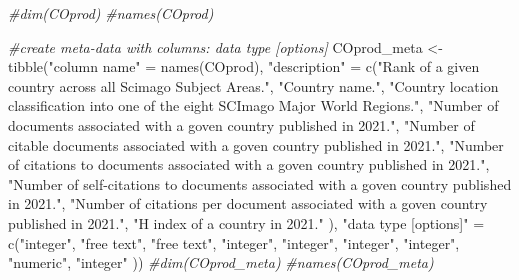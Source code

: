 \documentclass[
]{article}
\newenvironment{Shaded}{\begin{snugshade}}{\end{snugshade}}
\newcommand{\CommentTok}[1]{\textcolor[rgb]{0.56,0.35,0.01}{\textit{#1}}}
\newcommand{\FunctionTok}[1]{\textcolor[rgb]{0.00,0.00,0.00}{#1}}
\newcommand{\NormalTok}[1]{#1}
\newcommand{\OtherTok}[1]{\textcolor[rgb]{0.56,0.35,0.01}{#1}}
\newcommand{\StringTok}[1]{\textcolor[rgb]{0.31,0.60,0.02}{#1}}
\begin{document}
\begin{Shaded}
\begin{Highlighting}[]
\CommentTok{\#dim(COprod)}
\CommentTok{\#names(COprod)}

\CommentTok{\#create meta{-}data with columns:         data type [options]}
\NormalTok{COprod\_meta }\OtherTok{\textless{}{-}} \FunctionTok{tibble}\NormalTok{(}\StringTok{"column name"} \OtherTok{=} \FunctionTok{names}\NormalTok{(COprod), }
                      \StringTok{"description"} \OtherTok{=} \FunctionTok{c}\NormalTok{(}\StringTok{"Rank of a given country across all Scimago Subject Areas."}\NormalTok{,}
                                        \StringTok{"Country name."}\NormalTok{,}
                                        \StringTok{"Country location classification into one of the eight SCImago Major World Regions."}\NormalTok{,}
                                        \StringTok{"Number of documents associated with a goven country published in 2021."}\NormalTok{,}
                                        \StringTok{"Number of citable documents associated with a goven country published in 2021."}\NormalTok{,}
                                        \StringTok{"Number of citations to documents associated with a goven country published in 2021."}\NormalTok{,}
                                        \StringTok{"Number of self{-}citations to documents associated with a goven country published in 2021."}\NormalTok{,}
                                        \StringTok{"Number of citations per document associated with a goven country published in 2021."}\NormalTok{,}
                                        \StringTok{"H index of a country in 2021."}\NormalTok{ ),}
                      \StringTok{"data type [options]"} \OtherTok{=} \FunctionTok{c}\NormalTok{(}\StringTok{"integer"}\NormalTok{,}
                                                \StringTok{"free text"}\NormalTok{,}
                                                \StringTok{"free text"}\NormalTok{,}
                                                \StringTok{"integer"}\NormalTok{,}
                                                \StringTok{"integer"}\NormalTok{,}
                                                \StringTok{"integer"}\NormalTok{,}
                                                \StringTok{"integer"}\NormalTok{,}
                                                \StringTok{"numeric"}\NormalTok{,}
                                                \StringTok{"integer"}
\NormalTok{                                                ))}
\CommentTok{\#dim(COprod\_meta)}
\CommentTok{\#names(COprod\_meta)}
\end{Highlighting}
\end{Shaded}
\end{document}
